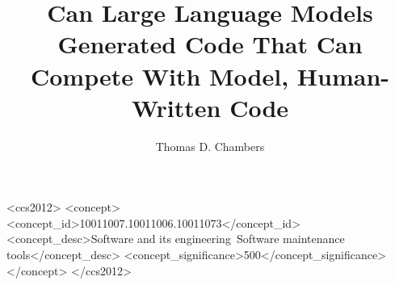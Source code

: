 \documentclass[manuscript,screen,review,sigconf]{acmart}
\begin{document}
\title{Can Large Language Models Generated Code That Can Compete With Model, Human-Written Code}

\author{Thomas D. Chambers}





\begin{CCSXML}
<ccs2012>
   <concept>
       <concept_id>10011007.10011006.10011073</concept_id>
       <concept_desc>Software and its engineering~Software maintenance tools</concept_desc>
       <concept_significance>500</concept_significance>
       </concept>
 </ccs2012>
\end{CCSXML}




\end{document}
